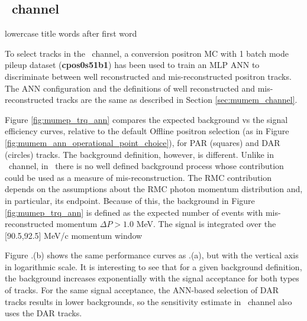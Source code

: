 \subsection{\MuToEp\ channel}
\label{sec:mumep_channel}
{\blue lowercase title words after first word}

To select tracks in {\blue the} \MuToEp\ channel, a  {\blue conversion positron MC with 1 batch}
mode pileup  {\blue dataset ({\bf cpos0s51b1})}
has been used to train  {\blue an} MLP ANN to discriminate between  {\blue well reconstructed}
and mis-reconstructed positron tracks.
The ANN configuration and the definitions of  well reconstructed and mis-reconstructed tracks are
the same as described in Section \ref{sec:mumem_channel}.

Figure \ref{fig:mumep_trq_ann} compares the expected background vs the signal efficiency curves,
 {\blue relative to the default Offline positron selection (as in Figure \ref{fig:mumem_ann_operational_point_choice})},
for PAR (squares) and DAR {\blue (}circles) tracks.
The background definition, however, is different. Unlike in \MuToEm\ channel, in \MuToEp\ there is
no well defined background process  {\blue whose} contribution could be used as a measure of mis-reconstruction.
The RMC contribution depends on the assumptions about the RMC photon momentum distribution and,
in particular, its endpoint. Because of this, the background in Figure \strike{\ref{fig:mumem_ann_operational_point_choice}}
{\blue \ref{fig:mumep_trq_ann}}
is defined as the expected number of events with  {\blue mis-reconstructed} momentum $\Delta{P} > 1.0$ MeV.
The signal is integrated over the [90.5,92.5] MeV/c momentum window

Figure \strike{\ref{fig:mumem_ann_operational_point_choice}}{\blue \ref{fig:mumep_trq_ann}}.(b) shows the same performance curves
as \strike{\ref{fig:mumem_ann_operational_point_choice}}{\blue \ref{fig:mumep_trq_ann}}.(a), but with the vertical axis in logarithmic scale.
It is interesting to see\strike{,} that for {\blue a} given background definition, the background increases exponentially
with the signal acceptance for both types of tracks.
For the same signal acceptance, the ANN-based selection of DAR tracks results in lower
background{\blue s}, so the sensitivity estimate in \MuToEp\ channel also uses the DAR tracks. 

